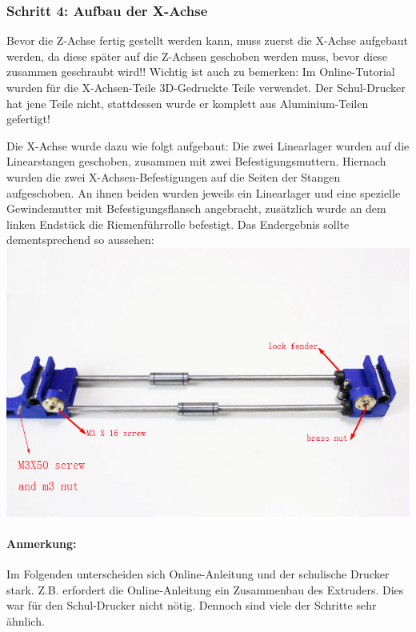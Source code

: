\subsubsection{Schritt 4: Aufbau der X-Achse}
Bevor die Z-Achse fertig gestellt werden kann, muss zuerst die X-Achse aufgebaut werden, da diese später auf die Z-Achsen geschoben werden muss, bevor diese zusammen geschraubt wird!! 
Wichtig ist auch zu bemerken: Im Online-Tutorial wurden für die X-Achsen-Teile 3D-Gedruckte Teile verwendet. Der Schul-Drucker hat jene Teile nicht, stattdessen wurde er komplett aus Aluminium-Teilen gefertigt!

Die X-Achse wurde dazu wie folgt aufgebaut:
Die zwei Linearlager wurden auf die Linearstangen geschoben, zusammen mit zwei Befestigungsmuttern. Hiernach wurden die zwei X-Achsen-Befestigungen auf die Seiten der Stangen aufgeschoben. An ihnen beiden wurden jeweils ein Linearlager und eine spezielle Gewindemutter mit Befestigungsflansch angebracht, zusätzlich wurde an dem linken Endstück die Riemenführrolle befestigt.
Das Endergebnis sollte dementsprechend so aussehen:\\
\includegraphics[clip=true, trim=0 0 0 100, width=\textwidth]{Bilder/X_Assembly_1.jpg}

\paragraph{Anmerkung:} Im Folgenden unterscheiden sich Online-Anleitung und der schulische Drucker stark. Z.B. erfordert die Online-Anleitung ein Zusammenbau des Extruders. Dies war für den Schul-Drucker nicht nötig. Dennoch sind viele der Schritte sehr ähnlich.

